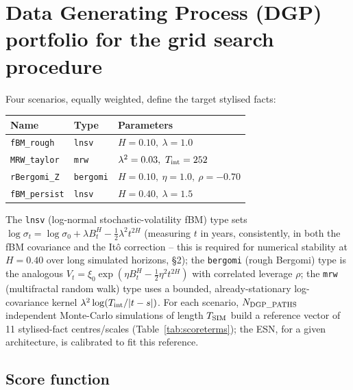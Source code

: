 \documentclass[11pt,a4paper]{article}
\begin{document}
\section{Data Generating Process (DGP) portfolio for the grid search procedure}

Four scenarios, equally weighted, define the target stylised facts:

\begin{center}
\begin{tabular}{@{}lll@{}}
\toprule
Name & Type & Parameters \\
\midrule
\texttt{fBM\_rough}   & \texttt{lnsv}    & $H=0.10,\ \lambda=1.0$ \\
\texttt{MRW\_taylor}  & \texttt{mrw}     & $\lambda^2=0.03,\ T_{\rm int}=252$ \\
\texttt{rBergomi\_Z}  & \texttt{bergomi} & $H=0.10,\ \eta=1.0,\ \rho=-0.70$ \\
\texttt{fBM\_persist} & \texttt{lnsv}    & $H=0.40,\ \lambda=1.5$ \\
\bottomrule
\end{tabular}
\end{center}

The \texttt{lnsv} (log-normal stochastic-volatility fBM) type sets
$\log\sigma_t=\log\sigma_0+\lambda B_t^H-\tfrac12\lambda^2t^{2H}$
(measuring $t$ in years, consistently, in both the fBM covariance and
the It\^o correction -- this is required for numerical stability at
$H=0.40$ over long simulated horizons, \S2); the \texttt{bergomi}
(rough Bergomi) type is the analogous
$V_t=\xi_0\exp(\eta B_t^H-\tfrac12\eta^2t^{2H})$ with correlated
leverage $\rho$; the \texttt{mrw} (multifractal random walk) type uses
a bounded, already-stationary log-covariance kernel
$\lambda^2\log(T_{\rm int}/|t-s|)$. For each scenario, $N_{\rm DGP\_PATHS}$
independent Monte-Carlo simulations of length $T_{\rm SIM}$ build a
reference vector of 11 stylised-fact centres/scales
(Table~\ref{tab:scoreterms}); the ESN, for a given architecture, is
calibrated to fit this reference.

\subsection{Score function}
\end{document}
